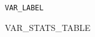 {\huge \noindent\verb|VAR_LABEL|\\}

\vspace*{0.01\textwidth}

\noindent%
\begin{minipage}{1.0\textwidth}
\centering
\large
VAR_STATS_TABLE
\end{minipage}%

\clearpage


